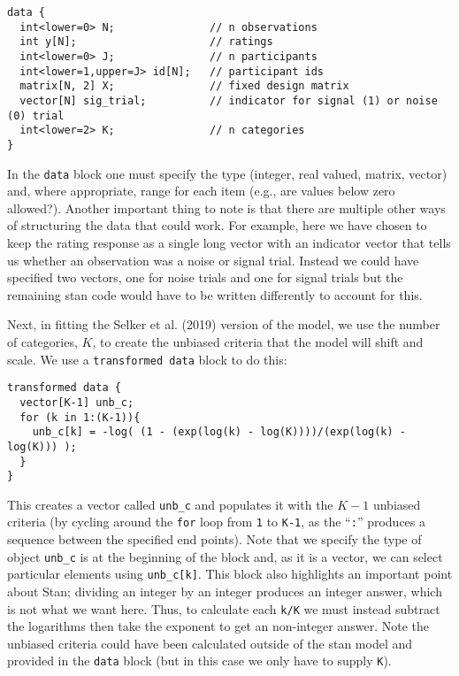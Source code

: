 \documentclass[
  english,
  ,man,floatsintext]{apa6}
\begin{document}
\begin{verbatim}
data {
  int<lower=0> N;               // n observations
  int y[N];                     // ratings
  int<lower=0> J;               // n participants
  int<lower=1,upper=J> id[N];   // participant ids
  matrix[N, 2] X;               // fixed design matrix
  vector[N] sig_trial;          // indicator for signal (1) or noise (0) trial
  int<lower=2> K;               // n categories
}
\end{verbatim}

In the \texttt{data} block one must specify the type (integer, real valued, matrix, vector) and, where appropriate, range for each item (e.g., are values below zero allowed?). Another important thing to note is that there are multiple other ways of structuring the data that could work. For example, here we have chosen to keep the rating response as a single long vector with an indicator vector that tells us whether an observation was a noise or signal trial. Instead we could have specified two vectors, one for noise trials and one for signal trials but the remaining stan code would have to be written differently to account for this.

Next, in fitting the Selker et al. (2019) version of the model, we use the number of categories, \(K\), to create the unbiased criteria that the model will shift and scale. We use a \texttt{transformed\ data} block to do this:

\begin{verbatim}
transformed data {
  vector[K-1] unb_c;
  for (k in 1:(K-1)){
    unb_c[k] = -log( (1 - (exp(log(k) - log(K))))/(exp(log(k) - log(K))) );
  }
}
\end{verbatim}

This creates a vector called \texttt{unb\_c} and populates it with the \(K - 1\) unbiased criteria (by cycling around the \texttt{for} loop from \texttt{1} to \texttt{K-1}, as the \enquote{\texttt{:}} produces a sequence between the specified end points). Note that we specify the type of object \texttt{unb\_c} is at the beginning of the block and, as it is a vector, we can select particular elements using \texttt{unb\_c{[}k{]}}. This block also highlights an important point about Stan; dividing an integer by an integer produces an integer answer, which is not what we want here. Thus, to calculate each \texttt{k/K} we must instead subtract the logarithms then take the exponent to get an non-integer answer. Note the unbiased criteria could have been calculated outside of the stan model and provided in the \texttt{data} block (but in this case we only have to supply \texttt{K}).
\end{document}
